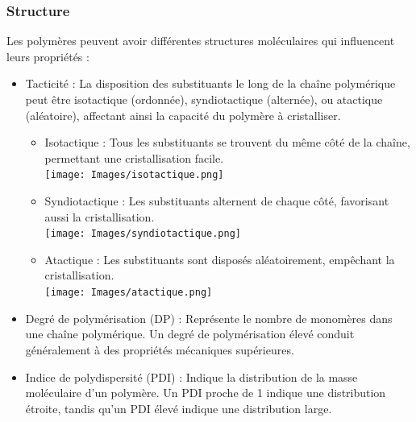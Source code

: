 \documentclass{article}
\begin{document}
        \subsubsection{Structure}
        Les polymères peuvent avoir différentes structures moléculaires qui influencent leurs propriétés :
    
        \begin{itemize}
            \item Tacticité : La disposition des substituants le long de la chaîne polymérique peut être isotactique (ordonnée), syndiotactique (alternée), ou atactique (aléatoire), affectant ainsi la capacité du polymère à cristalliser.
            \begin{itemize}
                \item Isotactique : Tous les substituants se trouvent du même côté de la chaîne, permettant une cristallisation facile. \\
                    \texttt{[image: Images/isotactique.png]}
                \item Syndiotactique : Les substituants alternent de chaque côté, favorisant aussi la cristallisation. \\
                    \texttt{[image: Images/syndiotactique.png]}
                    \pagebreak
                \item Atactique : Les substituants sont disposés aléatoirement, empêchant la cristallisation. \\
                    \texttt{[image: Images/atactique.png]}
            \end{itemize}
            \item Degré de polymérisation (DP) : Représente le nombre de monomères dans une chaîne polymérique. Un degré de polymérisation élevé conduit généralement à des propriétés mécaniques supérieures.
            \item Indice de polydispersité (PDI) : Indique la distribution de la masse moléculaire d'un polymère. Un PDI proche de 1 indique une distribution étroite, tandis qu'un PDI élevé indique une distribution large.
        \end{itemize}
    
\end{document}
